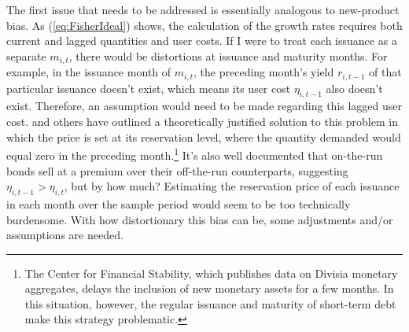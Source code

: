 \documentclass[11pt,a4paper,margin=1.5in]{article}
\begin{document}
The first issue that needs to be addressed is essentially analogous to new-product bias.
As (\ref{eq:FisherIdeal}) shows, the calculation of the growth rates requires both current and lagged quantities and user costs. 
If I were to treat each issuance as a separate $m_{i,t}$, there would be distortions at issuance and maturity months.
For example, in the issuance month of $m_{i,t}$, the preceding month's yield $r_{i,t-1}$ of that particular issuance doesn't exist, which means its user cost $\eta_{i,t-1}$ also doesn't exist.
Therefore, an assumption would need to be made regarding this lagged user cost.
\citet{Feenstra:1994} and others have outlined a theoretically justified solution to this problem in which the price is set at its reservation level, where the quantity demanded would equal zero in the preceding month.\footnote{
	The Center for Financial Stability, which publishes data on Divisia monetary aggregates, delays the inclusion of new monetary assets for a few months.
	In this situation, however, the regular issuance and maturity of short-term debt make this strategy problematic.}
It's also well documented that on-the-run bonds sell at a premium over their off-the-run counterparts, suggesting $\eta_{i,t-1} > \eta_{i,t}$, but by how much?
Estimating the reservation price of each issuance in each month over the sample period would seem to be too technically burdensome. 
With how distortionary this bias can be, some adjustments and/or assumptions are needed.
\end{document}
